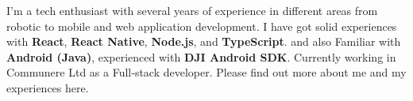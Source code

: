 \begin{cvparagraph}
I’m a tech enthusiast with several years of experience in different areas from robotic to mobile and web application development. I have got solid experiences with \textbf{React}, \textbf{React Native}, \textbf{Node.js}, and \textbf{TypeScript}. and also Familiar with \textbf{Android (Java)}, experienced with \textbf{DJI Android SDK}.\break
Currently working in Communere Ltd as a Full‑stack developer. Please find out more about me and my experiences here.
\end{cvparagraph}
